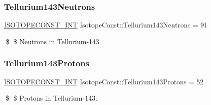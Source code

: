 \subsubsection{\texorpdfstring{Tellurium143\+Neutrons}{Tellurium143Neutrons}}
{\footnotesize\ttfamily \mbox{\hyperlink{group___isotope_const-_macros_ga5f18360b3e99483a35c32d789e62621c}{I\+S\+O\+T\+O\+P\+E\+C\+O\+N\+S\+T\+\_\+\+I\+NT}} Isotope\+Const\+::\+Tellurium143\+Neutrons = 91}

\$ \$ Neutrons in Tellurium-\/143. \mbox{\label{group___isotope_const-_tellurium-_te143_ga670380dc46cf99bc2d3380f3e36ab939}} 
\subsubsection{\texorpdfstring{Tellurium143\+Protons}{Tellurium143Protons}}
{\footnotesize\ttfamily \mbox{\hyperlink{group___isotope_const-_macros_ga5f18360b3e99483a35c32d789e62621c}{I\+S\+O\+T\+O\+P\+E\+C\+O\+N\+S\+T\+\_\+\+I\+NT}} Isotope\+Const\+::\+Tellurium143\+Protons = 52}

\$ \$ Protons in Tellurium-\/143. 